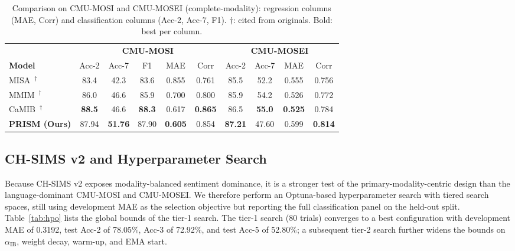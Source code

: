 \begin{table}[t]
  \centering
  \footnotesize
  \setlength{\tabcolsep}{3pt}
  \begin{tabular}{lccccccccc}
    \toprule
    & \multicolumn{5}{c}{\textbf{CMU-MOSI}} & \multicolumn{4}{c}{\textbf{CMU-MOSEI}} \\
    \cmidrule(lr){2-6} \cmidrule(lr){7-10}
    \textbf{Model} & Acc-2 & Acc-7 & F1 & MAE & Corr & Acc-2 & Acc-7 & MAE & Corr \\
    \midrule
    MISA~\citep{hazarika2020misa}$^{\dagger}$
      & 83.4 & 42.3 & 83.6 & 0.855 & 0.761
      & 85.5 & 52.2 & 0.555 & 0.756 \\
    MMIM~\citep{han2021mmim}$^{\dagger}$
      & 86.0 & 46.6 & 85.9 & 0.700 & 0.800
      & 85.9 & 54.2 & 0.526 & 0.772 \\
    CaMIB~\citep{jiang2025towards}$^{\dagger}$
      & \textbf{88.5} & 46.6 & \textbf{88.3} & 0.617 & \textbf{0.865}
      & 86.5 & \textbf{55.0} & \textbf{0.525} & 0.784 \\
    \midrule
    \textbf{PRISM (Ours)}
      & 87.94 & \textbf{51.76} & 87.90 & \textbf{0.605} & 0.854
      & \textbf{87.21} & 47.60 & 0.599 & \textbf{0.814} \\
    \bottomrule
  \end{tabular}
  \caption{Comparison on CMU-MOSI and CMU-MOSEI (complete-modality): regression
    columns (MAE, Corr) and classification columns (Acc-2, Acc-7, F1).
    $\dagger$: cited from originals. Bold: best per column.}
  \label{tab:lit}
\end{table}

\subsection{CH-SIMS v2 and Hyperparameter Search}
\label{sec:res-sims}
Because CH-SIMS v2 exposes modality-balanced sentiment dominance, it is a
stronger test of the primary-modality-centric design than the
language-dominant CMU-MOSI and CMU-MOSEI.
We therefore perform an Optuna-based hyperparameter search with tiered search
spaces, still using development MAE as the selection objective but reporting
the full classification panel on the held-out split.
Table~\ref{tab:hpo} lists the global bounds of the tier-1 search.
The tier-1 search (80 trials) converges to a best configuration with
development MAE of 0.3192, test Acc-2 of 78.05\%, Acc-3 of 72.92\%, and test
Acc-5 of 52.80\%;
a subsequent tier-2 search further widens the bounds on $\alpha_{\mathrm{IB}}$,
weight decay, warm-up, and EMA start.

